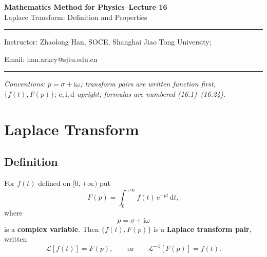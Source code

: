 \documentclass[11pt,a4paper]{article}
\theoremstyle{definition}
\theoremstyle{plain}
\begin{document}
\begin{center}
    {\LARGE \textbf{Mathematics Method for Physics--Lecture 16}} \\[0.6em]
    {\large Laplace Transform: Definition and Properties}
\end{center}

\vspace{-0.5em}
\noindent\rule{\textwidth}{0.5pt}
\vspace{0.3em}

\begin{center}
    Instructor: Zhaolong Han, SOCE, Shanghai Jiao Tong University;
\end{center}

\vspace{-0.6em}
\noindent Email: han.arkey@sjtu.edu.cn

\vspace{0.4em}
\noindent\rule{\textwidth}{0.5pt}

\vspace{0.8em}
\noindent\textit{Conventions: $p=\sigma+\mathrm{i}\omega$; transform pairs are written function
first, $\{f(t),F(p)\}$; $\mathrm{e},\mathrm{i},\mathrm{d}$ upright; formulas are numbered
(16.1)--(16.24).}

\vspace{1.5em}

\setcounter{section}{15}

\section{Laplace Transform}

\subsection{Definition}

For $f(t)$ defined on $[0,+\infty)$ put
\begin{equation}
F(p)=\int_{0}^{+\infty} f(t)\,\mathrm{e}^{-pt}\,\mathrm{d}t, \tag{16.1}
\end{equation}
where
\begin{equation}
p=\sigma+\mathrm{i}\omega \tag{16.2}
\end{equation}
is a \textbf{complex variable}. Then $\{f(t),F(p)\}$ is a \textbf{Laplace transform pair}, written
\begin{equation}
\mathcal{L}\left[f(t)\right]=F(p),\qquad\text{or}\qquad
\mathcal{L}^{-1}\left[F(p)\right]=f(t). \tag{16.3}
\end{equation}
\end{document}
